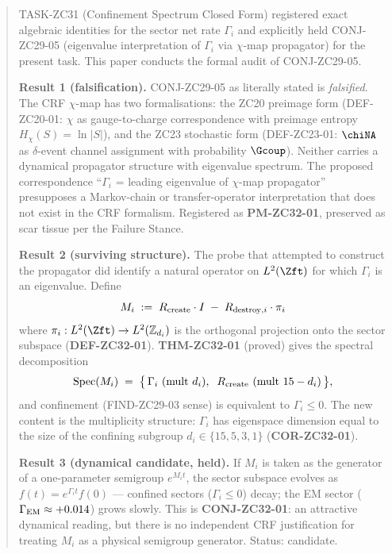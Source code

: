 \documentclass[12pt, a4paper]{article}
\begin{document}
\begin{abstract}
\sloppy
TASK-ZC31 (Confinement Spectrum Closed Form) registered exact
algebraic identities for the sector net rate $\Gamma_i$ and
explicitly held CONJ-ZC29-05 (eigenvalue interpretation of
$\Gamma_i$ via $\chi$-map propagator) for the present task.
This paper conducts the formal audit of CONJ-ZC29-05.

\textbf{Result 1 (falsification).} CONJ-ZC29-05 as literally
stated is \emph{falsified}. The CRF $\chi$-map has two
formalisations: the ZC20 preimage form
(DEF-ZC20-01: $\chi$ as gauge-to-charge correspondence with
preimage entropy $H_\chi(S) = \ln|S|$), and the ZC23 stochastic
form (DEF-ZC23-01: $\chiNA$ as $\delta$-event channel
assignment with probability $\Gcoup$). Neither carries a
dynamical propagator structure with eigenvalue spectrum.
The proposed correspondence ``$\Gamma_i$ = leading eigenvalue
of $\chi$-map propagator'' presupposes a Markov-chain or
transfer-operator interpretation that does not exist in the
CRF formalism. Registered as \textbf{PM-ZC32-01}, preserved
as scar tissue per the Failure Stance.

\textbf{Result 2 (surviving structure).} The probe that
attempted to construct the propagator did identify a natural
operator on $L^2(\Zft)$ for which $\Gamma_i$ is an eigenvalue.
Define
\[
  M_i \;:=\; R_{\rm create}\cdot I
            \;-\; R_{{\rm destroy},i}\cdot \pi_i
\]
where $\pi_i: L^2(\Zft) \to L^2(\mathbb{Z}_{d_i})$ is the
orthogonal projection onto the sector subspace
(\textbf{DEF-ZC32-01}). \textbf{THM-ZC32-01} (proved) gives
the spectral decomposition
\[
  \mathrm{Spec}(M_i) \;=\; \bigl\{\,\Gamma_i\ (\mathrm{mult}\
  d_i),\;\; R_{\rm create}\ (\mathrm{mult}\ 15-d_i)\,\bigr\},
\]
and confinement (FIND-ZC29-03 sense) is equivalent to
$\Gamma_i \leq 0$. The new content is the multiplicity
structure: $\Gamma_i$ has eigenspace dimension equal to the
size of the confining subgroup $d_i \in \{15, 5, 3, 1\}$
(\textbf{COR-ZC32-01}).

\textbf{Result 3 (dynamical candidate, held).} If $M_i$ is
taken as the generator of a one-parameter semigroup
$e^{M_i t}$, the sector subspace evolves as $f(t) =
e^{\Gamma_i t} f(0)$ --- confined sectors ($\Gamma_i \leq 0$)
decay; the EM sector ($\Gamma_{\rm EM} \approx +0.014$) grows
slowly. This is \textbf{CONJ-ZC32-01}: an attractive
dynamical reading, but there is no independent CRF
justification for treating $M_i$ as a physical semigroup
generator. Status: candidate.


\end{abstract}
\end{document}
